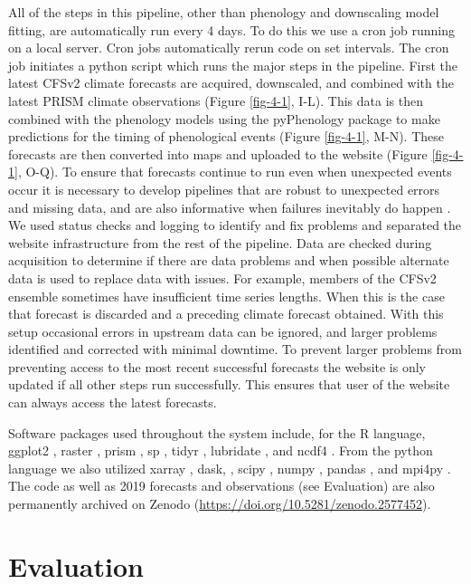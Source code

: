 All of the steps in this pipeline, other than phenology and downscaling model fitting, are automatically run every 4 days. To do this we use a cron job running on a local server. Cron jobs automatically rerun code on set intervals. The cron job initiates a python script which runs the major steps in the pipeline. First the latest CFSv2 climate forecasts are acquired, downscaled, and combined with the latest PRISM climate observations (Figure \ref{fig-4-1}, I-L). This data is then combined with the phenology models using the pyPhenology package to make predictions for the timing of phenological events (Figure \ref{fig-4-1}, M-N). These forecasts are then converted into maps and uploaded to the website (Figure \ref{fig-4-1}, O-Q). To ensure that forecasts continue to run even when unexpected events occur it is necessary to develop pipelines that are robust to unexpected errors and missing data, and are also informative when failures inevitably do happen \citep{welch2019}. We used status checks and logging to identify and fix problems and separated the website infrastructure from the rest of the pipeline. Data are checked during acquisition to determine if there are data problems and when possible alternate data is used to replace data with issues. For example, members of the CFSv2 ensemble sometimes have insufficient time series lengths. When this is the case that forecast is discarded and a preceding climate forecast obtained. With this setup occasional errors in upstream data can be ignored, and larger problems identified and corrected with minimal downtime. To prevent larger problems from preventing access to the most recent successful forecasts the website is only updated if all other steps run successfully. This ensures that user of the website can always access the latest forecasts.

Software packages used throughout the system include, for the R language, ggplot2 \citep{ggplot2}, raster \citep{rasterR}, prism \citep{prismR}, sp \citep{sp1}, tidyr \citep{tidyr}, lubridate \citep{lubridate}, and ncdf4 \citep{ncdf4}. From the python language we also utilized xarray \citep{xarray}, dask, \citep{dask}, scipy \citep{scipy}, numpy \citep{numpy}, pandas \citep{pandas}, and mpi4py \citep{mpi4py}. The code as well as 2019 forecasts and observations (see Evaluation) are also permanently archived on Zenodo (\href{https://doi.org/10.5281/zenodo.2577452}{https://doi.org/10.5281/zenodo.2577452}).

\section{Evaluation}

